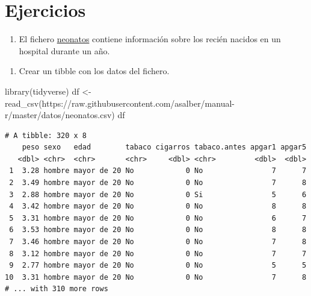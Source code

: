 \documentclass[
  a4paper,
]{scrreport}
\newenvironment{Shaded}{\begin{snugshade}}{\end{snugshade}}
\newcommand{\FunctionTok}[1]{\textcolor[rgb]{0.28,0.35,0.67}{#1}}
\newcommand{\NormalTok}[1]{\textcolor[rgb]{0.00,0.23,0.31}{#1}}
\newcommand{\OtherTok}[1]{\textcolor[rgb]{0.00,0.23,0.31}{#1}}
\newcommand{\StringTok}[1]{\textcolor[rgb]{0.13,0.47,0.30}{#1}}
\providecommand{\tightlist}{%
  \setlength{\itemsep}{0pt}\setlength{\parskip}{0pt}}\usepackage{longtable,booktabs,array}
\theoremstyle{definition}
\theoremstyle{definition}
\theoremstyle{remark}
\begin{document}
\hypertarget{ejercicios-4}{%
\section{Ejercicios}\label{ejercicios-4}}

\begin{enumerate}
\def\labelenumi{\arabic{enumi}.}
\tightlist
\item
  El fichero
  \href{https://raw.githubusercontent.com/asalber/manual-r/master/datos/neonatos.csv}{neonatos}
  contiene información sobre los recién nacidos en un hospital durante
  un año.
\end{enumerate}

\begin{enumerate}
\def\labelenumi{\alph{enumi}.}
\tightlist
\item
  Crear un tibble con los datos del fichero.
\end{enumerate}

\begin{tcolorbox}[enhanced jigsaw, opacitybacktitle=0.6, leftrule=.75mm, title=\textcolor{quarto-callout-note-color}{\faInfo}\hspace{0.5em}{Solución}, coltitle=black, rightrule=.15mm, colframe=quarto-callout-note-color-frame, left=2mm, opacityback=0, colbacktitle=quarto-callout-note-color!10!white, arc=.35mm, bottomtitle=1mm, toptitle=1mm, titlerule=0mm, breakable, bottomrule=.15mm, toprule=.15mm, colback=white]

\begin{Shaded}
\begin{Highlighting}[]
\FunctionTok{library}\NormalTok{(tidyverse)}
\NormalTok{df }\OtherTok{\textless{}{-}} \FunctionTok{read\_csv}\NormalTok{(}\StringTok{\textquotesingle{}https://raw.githubusercontent.com/asalber/manual{-}r/master/datos/neonatos.csv\textquotesingle{}}\NormalTok{)}
\NormalTok{df}
\end{Highlighting}
\end{Shaded}

\begin{verbatim}
# A tibble: 320 x 8
    peso sexo   edad        tabaco cigarros tabaco.antes apgar1 apgar5
   <dbl> <chr>  <chr>       <chr>     <dbl> <chr>         <dbl>  <dbl>
 1  3.28 hombre mayor de 20 No            0 No                7      7
 2  3.49 hombre mayor de 20 No            0 No                7      8
 3  2.88 hombre mayor de 20 No            0 Si                5      6
 4  3.42 hombre mayor de 20 No            0 No                8      8
 5  3.31 hombre mayor de 20 No            0 No                6      7
 6  3.53 hombre mayor de 20 No            0 No                8      8
 7  3.46 hombre mayor de 20 No            0 No                7      8
 8  3.12 hombre mayor de 20 No            0 No                7      7
 9  2.77 hombre mayor de 20 No            0 No                5      5
10  3.31 hombre mayor de 20 No            0 No                7      8
# ... with 310 more rows
\end{verbatim}

\end{tcolorbox}
\end{document}
